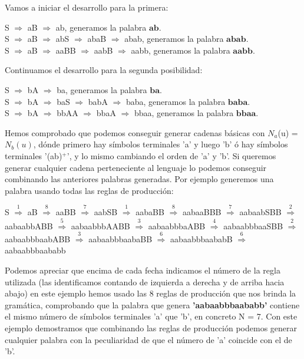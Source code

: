 Vamos a iniciar el desarrollo para la primera:
\begin{flushleft}
\qquad S $\Rightarrow$ aB $\Rightarrow$ ab, generamos la palabra $\textbf{ab}$.\\
\qquad S $\Rightarrow$ aB $\Rightarrow$ abS $\Rightarrow$ abaB $\Rightarrow$ abab, generamos la palabra $\textbf{abab}$.\\
\qquad S $\Rightarrow$ aB $\Rightarrow$ aaBB $\Rightarrow$ aabB $\Rightarrow$ aabb, generamos la palabra $\textbf{aabb}$.\\
\end{flushleft}
Continuamos el desarrollo para la segunda posibilidad:
\begin{flushleft}
\qquad S $\Rightarrow$ bA $\Rightarrow$ ba, generamos la palabra $\textbf{ba}$.\\
\qquad S $\Rightarrow$ bA $\Rightarrow$ baS $\Rightarrow$ babA $\Rightarrow$ baba, generamos la palabra $\textbf{baba}$.\\
\qquad S $\Rightarrow$ bA $\Rightarrow$ bbAA $\Rightarrow$ bbaA $\Rightarrow$ bbaa, generamos la palabra $\textbf{bbaa}$.\\
\end{flushleft}

Hemos comprobado que podemos conseguir generar cadenas básicas con $N_{a}$(u) = $N_{b}(u)$, dónde primero hay símbolos terminales 'a' y luego 'b' ó hay símbolos terminales '(ab)$^{+}$', y lo mismo cambiando el orden de 'a' y 'b'. Si queremos generar cualquier cadena perteneciente al lenguaje lo podemos conseguir combinando las anteriores palabras generadas. Por ejemplo generemos una palabra usando todas las reglas de producción:

\begin{center}
	 S $ \stackrel{1}{\Rightarrow} $ aB 
	 $\stackrel{8}{\Rightarrow}$ aaBB 
	 $\stackrel{7}{\Rightarrow}$ aabSB 
	 $\stackrel{1}{\Rightarrow}$ aabaBB  
	 $\stackrel{8}{\Rightarrow}$  aabaaBBB 
	 $\stackrel{7}{\Rightarrow}$ aabaabSBB 
	 $\stackrel{2}{\Rightarrow}$ aabaabbABB 
	 $\stackrel{5}{\Rightarrow}$  aabaabbbAABB $\stackrel{3}{\Rightarrow}$ aabaabbbaABB $\stackrel{4}{\Rightarrow}$ aabaabbbaaSBB $\stackrel{2}{\Rightarrow}$ aabaabbbaabABB $\stackrel{3}{\Rightarrow}$ aabaabbbaabaBB $\stackrel{6}{\Rightarrow}$ aabaabbbaababB $\stackrel{6}{\Rightarrow}$ aabaabbbaababb
\end{center}

Podemos apreciar que encima de cada fecha indicamos el número de la regla utilizada (las identificamos contando de izquierda a derecha y de arriba hacia abajo) en este ejemplo hemos usado las 8 reglas de producción que nos brinda la gramática, comprobando que la palabra que genera \textbf{'aabaabbbaababb'} contiene el mismo número de símbolos terminales 'a' que 'b', en concreto N = 7. Con este ejemplo demostramos que combinando las reglas de producción podemos generar cualquier palabra con la peculiaridad de que el número de 'a' coincide con el de 'b'.
	
